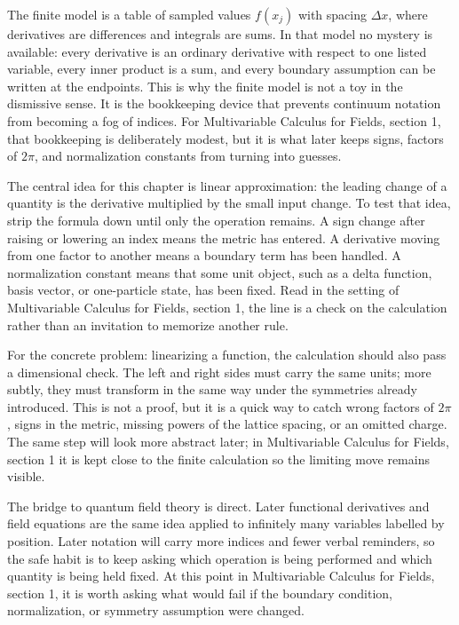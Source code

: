 The finite model is a table of sampled values \(f(x_j)\) with spacing \(\Delta x\), where derivatives are differences and integrals are sums.  In that model no mystery is available: every derivative is an ordinary derivative with respect to one listed variable, every inner product is a sum, and every boundary assumption can be written at the endpoints.  This is why the finite model is not a toy in the dismissive sense.  It is the bookkeeping device that prevents continuum notation from becoming a fog of indices.  For Multivariable Calculus for Fields, section 1, that bookkeeping is deliberately modest, but it is what later keeps signs, factors of \(2\pi\), and normalization constants from turning into guesses.

The central idea for this chapter is linear approximation: the leading change of a quantity is the derivative multiplied by the small input change.  To test that idea, strip the formula down until only the operation remains.  A sign change after raising or lowering an index means the metric has entered.  A derivative moving from one factor to another means a boundary term has been handled.  A normalization constant means that some unit object, such as a delta function, basis vector, or one-particle state, has been fixed.  Read in the setting of Multivariable Calculus for Fields, section 1, the line is a check on the calculation rather than an invitation to memorize another rule.

For the concrete problem: linearizing a function, the calculation should also pass a dimensional check.  The left and right sides must carry the same units; more subtly, they must transform in the same way under the symmetries already introduced.  This is not a proof, but it is a quick way to catch wrong factors of \(2\pi\), signs in the metric, missing powers of the lattice spacing, or an omitted charge.  The same step will look more abstract later; in Multivariable Calculus for Fields, section 1 it is kept close to the finite calculation so the limiting move remains visible.

The bridge to quantum field theory is direct.  Later functional derivatives and field equations are the same idea applied to infinitely many variables labelled by position.  Later notation will carry more indices and fewer verbal reminders, so the safe habit is to keep asking which operation is being performed and which quantity is being held fixed.  At this point in Multivariable Calculus for Fields, section 1, it is worth asking what would fail if the boundary condition, normalization, or symmetry assumption were changed.

